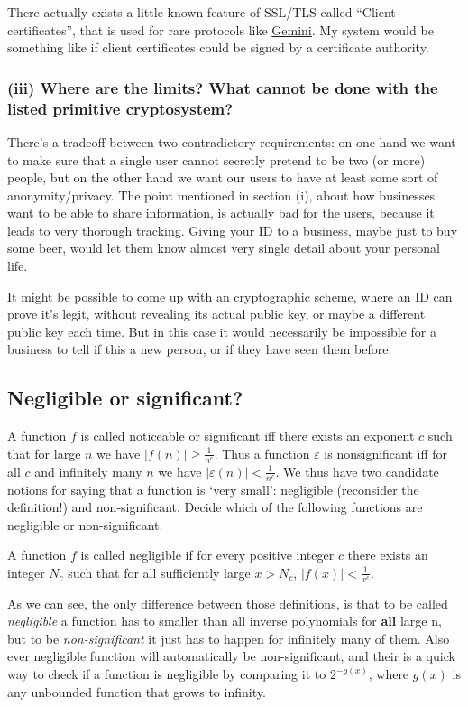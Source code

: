 \documentclass{article}
\begin{document}
  There actually exists a little known feature of SSL/TLS called ``Client certificates'',
  that is used for rare protocols like \href{https://en.wikipedia.org/wiki/Gemini_(protocol)}{Gemini}.
  My system would be something like if client certificates could be signed by a certificate authority.

  \subsubsection*{(iii) Where are the limits? What cannot be done with the listed primitive cryptosystem?}
  There's a tradeoff between two contradictory requirements:
  on one hand we want to make sure that a single user cannot secretly pretend to be two (or more) people,
  but on the other hand we want our users to have at least some sort of anonymity/privacy.
  The point mentioned in section (i), about how businesses want to be able to share information,
  is actually bad for the users, because it leads to very thorough tracking.
  Giving your ID to a business, maybe just to buy some beer, would let them know almost very single detail about your personal life.

  It might be possible to come up with an cryptographic scheme, where an ID can prove it's legit, without revealing its actual public key, or maybe a different public key each time.
  But in this case it would necessarily be impossible for a business to tell if this a new person, or if they have seen them before.

  \subsection{Negligible or significant?}
  \begin{centerframebox}
    A function $f$ is called noticeable or significant iff there exists an exponent
    $c$ such that for large $n$ we have $|f(n)| \geq \frac{1}{n^c}$.
    Thus a function $\varepsilon$ is nonsignificant iff for all $c$ and infinitely many $n$ we have $|\varepsilon(n)| < \frac{1}{n^c}$.
    We thus have two candidate notions for saying that a function is `very small':
    negligible (reconsider the definition!) and non-significant.
    Decide which of the following functions are negligible or non-significant.

    A function $f$ is called negligible if for every positive integer $c$ there exists an integer $N_c$
    such that for all sufficiently large $x > N_c$, $|f(x)| < \frac{1}{x^c}$.
  \end{centerframebox}
  As we can see, the only difference between those definitions,
  is that to be called \textit{negligible} a function has to smaller than all inverse polynomials for \textbf{all} large n,
  but to be \textit{non-significant} it just has to happen for infinitely many of them.
  Also ever negligible function will automatically be non-significant,
  and their is a quick way to check if a function is negligible by comparing it to $2^{-g(x)}$,
  where $g(x)$ is any unbounded function that grows to infinity.
\end{document}
